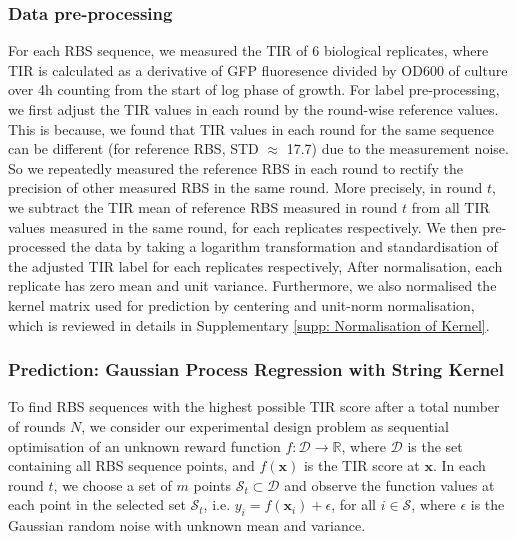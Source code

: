 \subsubsection{Data pre-processing}
\label{sec: method data pre-procesing}

For each RBS sequence, we measured the TIR of 6 biological replicates, where TIR is calculated as a derivative of GFP fluoresence divided by OD600 of culture over 4h counting from the start of log phase of growth. 
For label pre-processing, we first adjust the TIR values in each round by the round-wise reference values. This is because, we found that TIR values in each round for the same sequence can be different (for reference RBS, STD $\approx$ 17.7) due to the measurement noise. 
So we repeatedly measured the reference RBS in each round to rectify the precision of other measured RBS in the same round. 
More precisely, in round $t$, we subtract the TIR mean of reference RBS measured in round $t$ from all TIR values measured in the same round, for each replicates respectively. 
We then pre-processed the data by taking a logarithm transformation and standardisation of the adjusted TIR label for each replicates respectively, 
After normalisation, each replicate has zero mean and unit variance. 
Furthermore, we also normalised the kernel matrix used for prediction by centering and unit-norm normalisation, which is reviewed in details in Supplementary \ref{supp: Normalisation of Kernel}.


\subsubsection{Prediction: Gaussian Process Regression with String Kernel}

To find RBS sequences with the highest possible TIR score after a total number of rounds $N$,  we consider our experimental design problem as sequential optimisation of an unknown reward function $f: \mathcal{D} \rightarrow \mathbb{R}$, where $\mathcal{D}$ is the set containing all RBS sequence points, and $f(\mathbf{x})$ is the TIR score at $\mathbf{x}$. 
In each round $t$, we choose a set of $m$ points $\mathcal{S}_t \subset \mathcal{D}$ and observe the function values at each point in the selected set $\mathcal{S}_t$, i.e. $y_i = f(\mathbf{x}_i) + \epsilon$, for all $i \in \mathcal{S}$, where $\epsilon$ is the Gaussian random noise with unknown mean and variance. 

